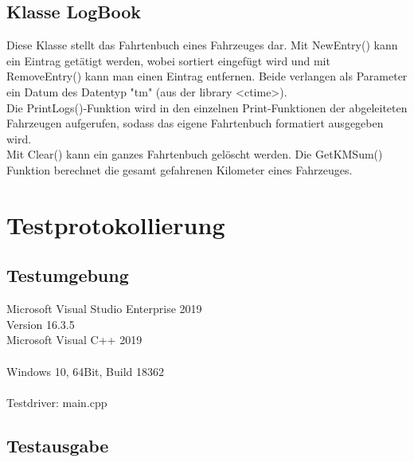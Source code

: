 \subsection{Klasse LogBook}
Diese Klasse stellt das Fahrtenbuch eines Fahrzeuges dar. Mit NewEntry() kann ein Eintrag getätigt werden, wobei sortiert eingefügt wird und mit RemoveEntry() kann man einen Eintrag entfernen. Beide verlangen als Parameter ein Datum des Datentyp "tm" (aus der library <ctime>). \\
Die PrintLogs()-Funktion wird in den einzelnen Print-Funktionen der abgeleiteten Fahrzeugen aufgerufen, sodass das eigene Fahrtenbuch formatiert ausgegeben wird. \\
Mit Clear() kann ein ganzes Fahrtenbuch gelöscht werden. Die GetKMSum() Funktion berechnet die gesamt gefahrenen Kilometer eines Fahrzeuges.


\newpage
\section{Testprotokollierung}


\subsection{Testumgebung}

Microsoft Visual Studio Enterprise 2019\\
Version 16.3.5\\
Microsoft Visual C++ 2019\\
\\
Windows 10, 64Bit, Build 18362\\
\\
Testdriver: main.cpp

\subsection{Testausgabe}




